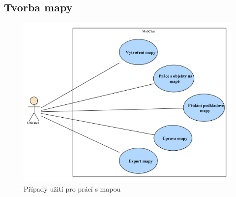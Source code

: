 \documentclass[thesis=B,czech]{resources/FITthesis}[2012/06/26]
\begin{document}
\subsection{Tvorba mapy}
	\begin{figure}\centering
		\includegraphics[width=1\textwidth]{images/usecase-mapa.pdf}
		\caption[Případy užití pro mapu]{Případy užití pro prácí s mapou}				\label{fig:uc_sablony}
	\end{figure}
	
\end{document}
